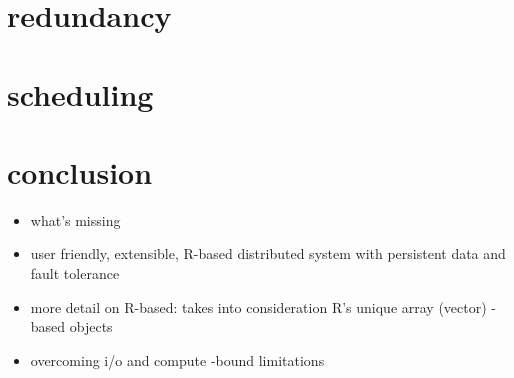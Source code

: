 \documentclass[a4paper,10pt]{article}
\begin{document}
\section{redundancy}
\section{scheduling}

\section{conclusion}
\begin{itemize}
	\item what's missing
	\item user friendly, extensible, R-based distributed system with persistent data and fault tolerance
	\item more detail on R-based: takes into consideration R's unique array (vector) -based objects
	\item overcoming i/o and compute -bound limitations
\end{itemize}

\printbibliography
\end{document}
